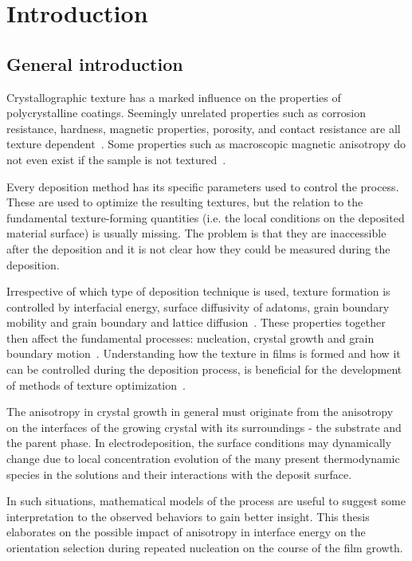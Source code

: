 \chapter{Introduction} \label{ch_introduction}




\section{General introduction}
Crystallographic texture has a marked influence on the properties of polycrystalline coatings. Seemingly unrelated properties such as corrosion resistance, hardness, magnetic properties, porosity, and contact resistance are all texture dependent~\cite{Schlesinger2010}. Some properties such as macroscopic magnetic anisotropy do not even exist if the sample is not textured~\cite{Dinnebier2008}.

Every deposition method has its specific parameters used to control the process. These are used to optimize the resulting textures, but the relation to the fundamental texture-forming quantities (i.e. the local conditions on the deposited material surface) is usually missing. The problem is that they are inaccessible after the deposition and it is not clear how they could be measured during the deposition. 

Irrespective of which type of deposition technique is used, texture formation is controlled by interfacial energy, surface diffusivity of adatoms, grain boundary mobility and grain boundary and lattice diffusion~\cite{Szpunar1997, Suwas2014}. These properties together then affect the fundamental processes: nucleation, crystal growth and grain boundary motion~\cite{Barna1998}. Understanding how the texture in films is formed and how it can be controlled during the deposition process, is beneficial for the development of methods of texture optimization~\cite{Szpunar1997}. 

The anisotropy in crystal growth in general must originate from the anisotropy on the interfaces of the growing crystal with its surroundings - the substrate and the parent phase. In electrodeposition, the surface conditions may dynamically change due to local concentration evolution of the many present thermodynamic species in the solutions and their interactions with the deposit surface. 

In such situations, mathematical models of the process are useful to suggest some interpretation to the observed behaviors to gain better insight. This thesis elaborates on the possible impact of anisotropy in interface energy on the orientation selection during repeated nucleation on the course of the film growth. 

